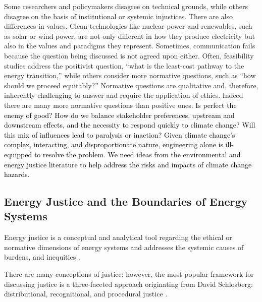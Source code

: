 Some researchers and policymakers disagree on technical grounds, while others
disagree on the basis of institutional or systemic injustices. There are also
differences in values. Clean technologies like nuclear power and renewables,
such as solar or wind power, are not only different in how they produce
electricity but also in the values and paradigms they represent. Sometimes,
communication fails because the question being discussed is not agreed upon
either. Often, feasibility studies address the positivist question, ``what is
the least-cost pathway to the energy transition,'' while others consider more
normative questions, such as ``how should we proceed equitably?'' Normative
questions are qualitative and, therefore, inherently challenging to answer and
require the application of ethics. Indeed there are many more normative
questions than positive ones. \textcolor{black}{Is perfect the enemy of good?
How do we balance stakeholder preferences, upstream and downstream effects, and
the necessity to respond quickly to climate change? Will this mix of influences
lead to paralysis or inaction?} \textcolor{black}{Given climate change's
complex, interacting, and disproportionate nature, engineering alone is
ill-equipped to resolve the problem. We need ideas from the environmental and
energy justice literature to help address the risks and impacts of climate
change hazards.}
\subsection{Energy Justice and the Boundaries of Energy Systems}



Energy justice is a conceptual and analytical tool regarding the ethical or
normative dimensions of energy systems and addresses the systemic causes of
burdens, and inequities \cite{sovacool_energy_2015}. 

    
    There are many conceptions of justice; however, the most popular framework
    for discussing justice is a three-faceted approach originating from David
    Schlosberg: distributional, recognitional, and procedural justice
    \cite{schlosberg_2_2007}.

    
